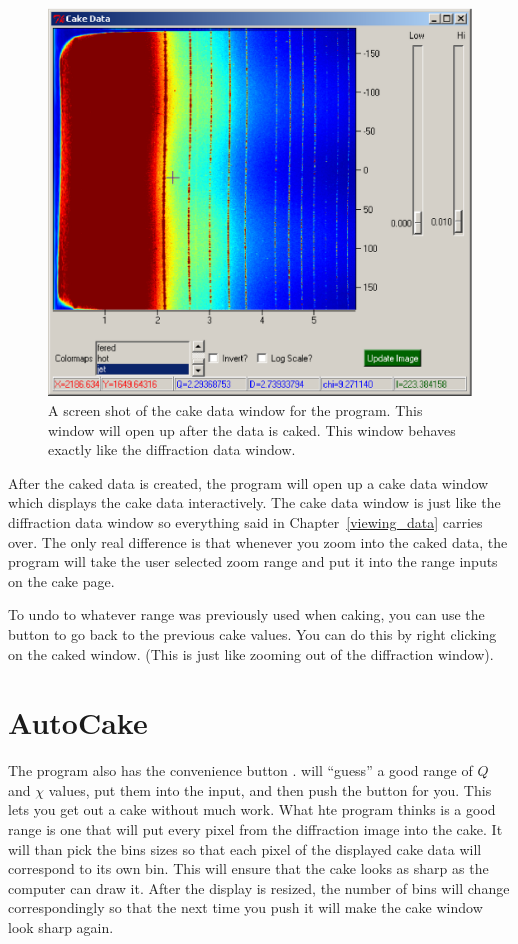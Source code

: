 \begin{figure}
    \centering
    \includegraphics[scale=.75]{figures/cake_data_window.eps}
    \caption{A screen shot of the cake data window for
    the program. This window will open up after the
    data is caked. This window behaves exactly like 
    the diffraction data window.} 
    \label{cake_data_window}
\end{figure}

After the caked data is created, the program will open up a cake data
window which displays the cake data interactively.
The cake data window is just like the diffraction
data window so everything said in Chapter~\ref{viewing_data} 
carries over. The only real difference is that whenever
you zoom into the caked data, the program will take the user
selected zoom range and put it into the range inputs on
the cake page.

To undo to whatever range was previously used when caking, 
you can use the  button to go back to the
previous cake values. You can do this by 
right clicking on the caked window. (This is just like
zooming out of the diffraction window). 

\section{AutoCake}

The program also has the convenience button .
 will ``guess'' a good range of $Q$ and $\chi$ 
values, put them into the input, and then push the 
 button for you. This lets you get out a 
cake without much work. What hte program thinks is a
good range is one that will put every pixel from the 
diffraction image into the cake. It will than pick
the bins sizes so that each pixel of the displayed 
cake data will correspond to its own bin. This will ensure
that the cake looks as sharp as the computer can draw it.
After the display is resized, the number of bins will
change correspondingly so that the next time you push
 it will make the cake window look sharp again.

